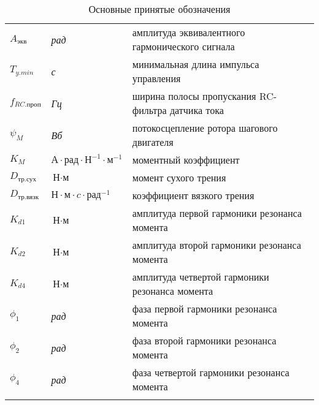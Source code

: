 \begin{longtabu}{X[-1,r]X[-1,l]X[l]}
    $A_{\textit{экв}}$              & \textit{рад}                              & амплитуда эквивалентного гармонического сигнала \\

    $T_{y.min}$                     & \textit{с}                                & минимальная длина импульса управления \\

    $f_{RC.\textit{проп}}$          & \textit{Гц}                               & ширина полосы пропускания RC-фильтра датчика тока \\

    $\psi_{M}$                      & \textit{Вб}                               & потокосцепление ротора шагового двигателя \\

    $K_{M}$                         & $\textit{А} \cdot \textit{рад} \cdot \textit{Н}^{-1} \cdot \textit{м}^{-1}$ & моментный коэффициент \\

    $D_{\textit{тр.сух}}$           & $\textit{Н} \cdot \textit{м}$             & момент сухого трения \\

    $D_{\textit{тр.вязк}}$          & $\textit{Н} \cdot \textit{м} \cdot \textit{c} \cdot \textit{рад}^{-1}$ & коэффициент вязкого трения \\

    $K_{d1}$                        & $\textit{Н} \cdot \textit{м}$             & амплитуда первой гармоники резонанса момента \\

    $K_{d2}$                        & $\textit{Н} \cdot \textit{м}$             & амплитуда второй гармоники резонанса момента \\

    $K_{d4}$                        & $\textit{Н} \cdot \textit{м}$             & амплитуда четвертой гармоники резонанса момента \\

    $\phi_{1}$                      & \textit{рад}                              & фаза первой гармоники резонанса момента \\

    $\phi_{2}$                      & \textit{рад}                              & фаза второй гармоники резонанса момента \\

    $\phi_{4}$                      & \textit{рад}                              & фаза четвертой гармоники резонанса момента \\

    \caption{Основные принятые обозначения}
\end{longtabu}
